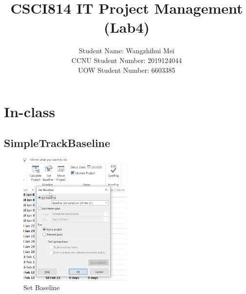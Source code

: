 \documentclass[runningheads]{llncs}
\begin{document}
\title{\large{CSCI814 IT Project Management (Lab4)}}

%
%
\author{\large{Student Name: Wangzhihui Mei \\ %
CCNU Student Number: 2019124044 \\ %
UOW Student Number: 6603385}}  %







\maketitle
\clearpage


\section*{In-class}
\subsection*{SimpleTrackBaseline}
\begin{figure}[H]
    \centering
    \includegraphics[width=0.5\textwidth]{./image/t2f1}
    \caption{Set Baseline}
\end{figure}
\end{document}
